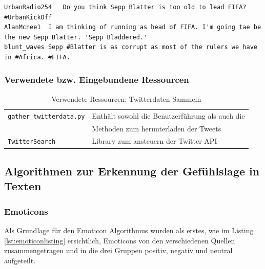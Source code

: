 \begin{lstlisting}[showtabs=true, caption={Twitter Logfile Format)}, label={lst:twitterlogformat}]
UrbanRadio254	Do you think Sepp Blatter is too old to lead FIFA? #UrbanKickOff
AlanMcnee1	I am thinking of running as head of FIFA. I'm going tae be the new Sepp Blatter. 'Sepp Bladdered.'
blunt_waves	Sepp #Blatter is as corrupt as most of the rulers we have in #Africa. #FIFA.
\end{lstlisting}

\subsubsection{Verwendete bzw. Eingebundene Ressourcen}
\begin{table}[H]
\begin{center}
\begin{tabular}{|l|l|}
	\hline
	\lstinline$gather_twitterdata.py$ & Enthält sowohl die Benutzerführung als auch die\\
	& Methoden zum herunterladen der Tweets \\ \hline
	\lstinline$TwitterSearch$ & Library zum ansteuern der Twitter API\\ \hline
\end{tabular}
\caption{Verwendete Ressourcen: Twitterdaten Sammeln}
\end{center}
\end{table}

\subsection{Algorithmen zur Erkennung der Gefühlslage in Texten}
\subsubsection{Emoticons}
Als Grundlage für den Emoticon Algorithmus wurden als erstes, wie im Listing \ref{lst:emoticonlisting} ersichtlich, Emoticons von den verschiedenen Quellen \cite{emoticons1}\cite{emoticons2}\cite{emoticons3}\cite{emoticons4} zusammengetragen und in die drei Gruppen positiv, negativ und neutral aufgeteilt.

